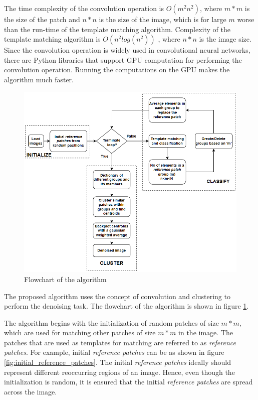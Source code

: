 \documentclass[fleqn,10pt]{wlscirep}
\begin{document}
The time complexity of the convolution operation is $O(m^2n^2)$, where $m*m$ is the size of the patch and $n*n$ is the size of the image, which is for large $m$ worse than the run-time of the template matching algorithm. Complexity of the template matching algorithm is $O(n^2log(n^2))$ \cite{template_matching}, where $n*n$ is the image size. Since the convolution operation is widely used in convolutional neural networks, there are Python libraries that support GPU computation for performing the convolution operation. Running the computations on the GPU makes the algorithm much faster.

\begin{figure}
	\centering
	\includegraphics[scale=0.7]{./imgs/flowchart.png}
	\caption{Flowchart of the algorithm}
	\label{fig:flowchart}
\end{figure} 

The proposed algorithm uses the concept of convolution and clustering to perform the denoising task. The flowchart of the algorithm is shown in figure \ref{fig:flowchart}.

The algorithm begins with the initialization of random patches of size $m*m$, which are used for matching other patches of size $m*m$ in the image. The patches that are used as templates for matching are referred to as \textit{reference patches}. For example, initial \textit{reference patches} can be as shown in figure \ref{fig:initial_reference_patches}. The initial \textit{reference patches} ideally should represent different reoccurring regions of an image. Hence, even though the initialization is random, it is ensured that the initial \textit{reference patches} are spread across the image.
\end{document}

